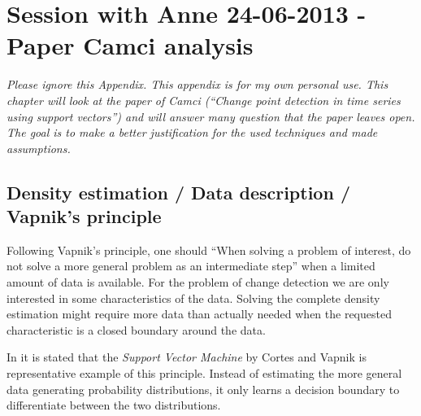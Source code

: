 
\chapter{Session with Anne 24-06-2013 - Paper Camci analysis} %

\label{AppendixB} %


\emph{Please ignore this Appendix.
This appendix is for my own personal use.
This chapter will look at the paper of Camci \cite{camci2010change} (``Change point detection in time series using support vectors'') and will answer many question that the paper leaves open.
The goal is to make a better justification for the used techniques and made assumptions.
}


\section{Density estimation / Data description / Vapnik's principle}
Following Vapnik's principle, one should ``When solving a problem of interest, do not solve a more general problem as an intermediate step'' \cite{vapnik1998statistical} when a limited amount of data is available.
For the problem of change detection we are only interested in some characteristics of the data.
Solving the complete density estimation might require more data than actually needed when the requested characteristic is a closed boundary around the data.

In \cite{liu2013change} it is stated that the \emph{Support Vector Machine} by Cortes and Vapnik \cite{cortes1995support} is representative example of this principle.
Instead of estimating the more general data generating probability distributions, it only learns a decision boundary to differentiate between the two distributions.

